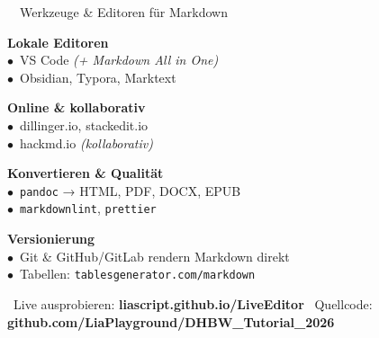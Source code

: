 \documentclass[a4paper,landscape,9pt]{extarticle}
\begin{document}
\noindent
\begin{mdinfo}{\faToolbox~~Werkzeuge \& Editoren für Markdown}
\footnotesize
\begin{minipage}[t]{0.24\linewidth}
\textbf{\color{mdblue}Lokale Editoren}\\[1pt]
$\bullet$~VS Code \textit{(+ Markdown All in One)}\\
$\bullet$~Obsidian, Typora, Marktext
\end{minipage}\hfill
\begin{minipage}[t]{0.22\linewidth}
\textbf{\color{mdblue}Online \& kollaborativ}\\[1pt]
$\bullet$~dillinger.io, stackedit.io\\
$\bullet$~hackmd.io \textit{(kollaborativ)}
\end{minipage}\hfill
\begin{minipage}[t]{0.24\linewidth}
\textbf{\color{mdblue}Konvertieren \& Qualität}\\[1pt]
$\bullet$~\texttt{pandoc} → HTML, PDF, DOCX, EPUB\\
$\bullet$~\texttt{markdownlint}, \texttt{prettier}
\end{minipage}\hfill
\begin{minipage}[t]{0.25\linewidth}
\textbf{\color{mdblue}Versionierung}\\[1pt]
$\bullet$~Git \& GitHub/GitLab rendern Markdown direkt\\
$\bullet$~Tabellen: \texttt{tablesgenerator.com/markdown}
\end{minipage}
\end{mdinfo}

\vfill
{\sffamily\scriptsize\color{muted}
\faInfoCircle~Live ausprobieren: \textbf{liascript.github.io/LiveEditor}\hfill
\faGithub~Quellcode: \textbf{github.com/LiaPlayground/DHBW\_Tutorial\_2026}}

\newpage
\end{document}
